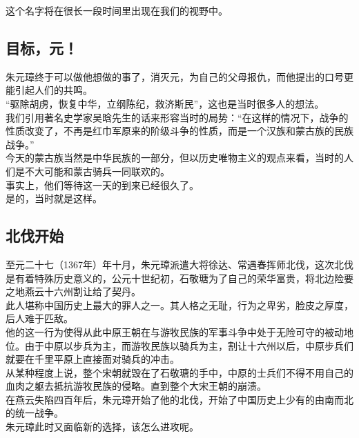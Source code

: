 \begin{multicols}{\theparacolNo}
这个名字将在很长一段时间里出现在我们的视野中。\\

\subsection{目标，元！}
朱元璋终于可以做他想做的事了，消灭元，为自己的父母报仇，而他提出的口号更能引起人们的共鸣。\\

“驱除胡虏，恢复中华，立纲陈纪，救济斯民”，这也是当时很多人的想法。\\

我们引用著名史学家吴晗先生的话来形容当时的局势：“在这样的情况下，战争的性质改变了，不再是红巾军原来的阶级斗争的性质，而是一个汉族和蒙古族的民族战争。”\\

今天的蒙古族当然是中华民族的一部分，但以历史唯物主义的观点来看，当时的人们是不大可能和蒙古骑兵一同联欢的。\\

事实上，他们等待这一天的到来已经很久了。\\

是的，当时就是这样。\\

\subsection{北伐开始}
至元二十七（1367年）年十月，朱元璋派遣大将徐达、常遇春挥师北伐，这次北伐是有着特殊历史意义的，公元十世纪初，石敬瑭为了自己的荣华富贵，将北边险要之地燕云十六州割让给了契丹。\\

此人堪称中国历史上最大的罪人之一。其人格之无耻，行为之卑劣，脸皮之厚度，后人难于匹敌。\\

他的这一行为使得从此中原王朝在与游牧民族的军事斗争中处于无险可守的被动地位。由于中原以步兵为主，而游牧民族以骑兵为主，割让十六州以后，中原步兵们就要在千里平原上直接面对骑兵的冲击。\\

从某种程度上说，整个宋朝就毁在了石敬瑭的手中，中原的士兵们不得不用自己的血肉之躯去抵抗游牧民族的侵略。直到整个大宋王朝的崩溃。\\

在燕云失陷四百年后，朱元璋开始了他的北伐，开始了中国历史上少有的由南而北的统一战争。\\

朱元璋此时又面临新的选择，该怎么进攻呢。\\


\end{multicols}
